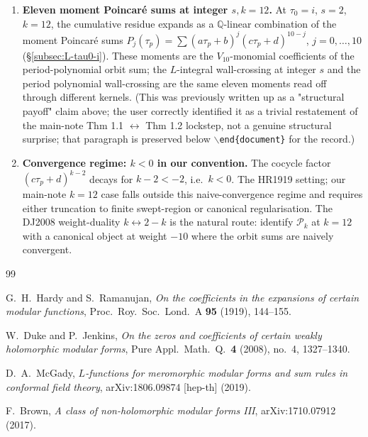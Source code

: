 \documentclass[11pt]{article}
\newcommand{\QQ}{\mathbb{Q}}
\begin{document}
\begin{enumerate}
\item \textbf{Eleven moment Poincar\'e sums at integer $s, k = 12$.}
  At $\tau_0 = i$, $s = 2$, $k = 12$, the cumulative residue expands
  as a $\QQ$-linear combination of the moment Poincar\'e sums
  $P_j(\tau_p) = \sum (a\tau_p + b)^j(c\tau_p + d)^{10 - j}$, $j = 0,
  \ldots, 10$ (\S\ref{subsec:L-tau0-i}).  These moments are the
  $V_{10}$-monomial coefficients of the period-polynomial orbit sum;
  the $L$-integral wall-crossing at integer $s$ and the period
  polynomial wall-crossing are the same eleven moments read off
  through different kernels.  (This was previously written up as a
  "structural payoff" claim above; the user correctly identified it
  as a trivial restatement of the main-note Thm 1.1 $\leftrightarrow$
  Thm 1.2 lockstep, not a genuine structural surprise; that
  paragraph is preserved below \texttt{$\backslash$end\{document\}}
  for the record.)

\item \textbf{Convergence regime: $k < 0$ in our convention.}  The
  cocycle factor $(c\tau_p + d)^{k - 2}$ decays for $k - 2 < -2$,
  i.e.\ $k < 0$.  The HR1919 setting; our main-note $k = 12$ case
  falls outside this naive-convergence regime and requires either
  truncation to finite swept-region or canonical
  regularisation.  The DJ2008 weight-duality $k \leftrightarrow 2 - k$
  is the natural route: identify $\mathcal{P}_k$ at $k = 12$ with a
  canonical object at weight $-10$ where the orbit sums are
  naively convergent.
\end{enumerate}

\begin{thebibliography}{99}

G.~H.\ Hardy and S.\ Ramanujan,
\emph{On the coefficients in the expansions of certain modular
functions}, Proc.\ Roy.\ Soc.\ Lond.\ A \textbf{95} (1919), 144--155.

W.\ Duke and P.\ Jenkins,
\emph{On the zeros and coefficients of certain weakly holomorphic
modular forms}, Pure Appl.\ Math.\ Q.\ \textbf{4} (2008), no.~4,
1327--1340.

D.\ A.\ McGady,
\emph{$L$-functions for meromorphic modular forms and sum rules in
conformal field theory}, arXiv:1806.09874 [hep-th] (2019).

F.\ Brown,
\emph{A class of non-holomorphic modular forms III}, arXiv:1710.07912
(2017).

\end{thebibliography}
\end{document}
